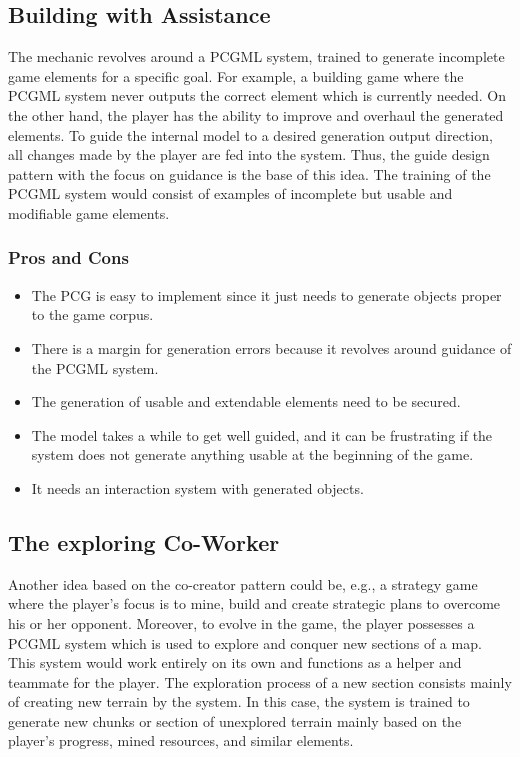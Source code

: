 \documentclass[MGS,Master,english]{twbook}%
\begin{document}
\subsection{Building with Assistance} \label{idea::buildingWithAssistance}
The mechanic revolves around a PCGML system, trained to generate incomplete game elements for a specific goal. For example, a building game where the PCGML system never outputs the correct element which is currently needed. On the other hand, the player has the ability to improve and overhaul the generated elements. To guide the internal model to a desired generation output direction, all changes made by the player are fed into the system. Thus, the guide design pattern with the focus on guidance is the base of this idea. The training of the PCGML system would consist of examples of incomplete but usable and modifiable game elements.

\subsubsection{Pros and Cons}
\begin{itemize}
	\item The PCG is easy to implement since it just needs to generate objects proper to the game corpus.
	\item There is a margin for generation errors because it revolves around guidance of the PCGML system.
	\item The generation of usable and extendable elements need to be secured.
	\item The model takes a while to get well guided, and it can be frustrating if the system does not generate anything usable at the beginning of the game.
	\item It needs an interaction system with generated objects.
\end{itemize}


\subsection{The exploring Co-Worker} \label{idea::exploringCoWorker}
Another idea based on the co-creator pattern could be, e.g., a strategy game where the player’s focus is to mine, build and create strategic plans to overcome his or her opponent. Moreover, to evolve in the game, the player possesses a PCGML system which is used to explore and conquer new sections of a map. This system would work entirely on its own and functions as a helper and teammate for the player. The exploration process of a new section consists mainly of creating new terrain by the system. In this case, the system is trained to generate new chunks or section of unexplored terrain mainly based on the player’s progress, mined resources, and similar elements.
\end{document}
